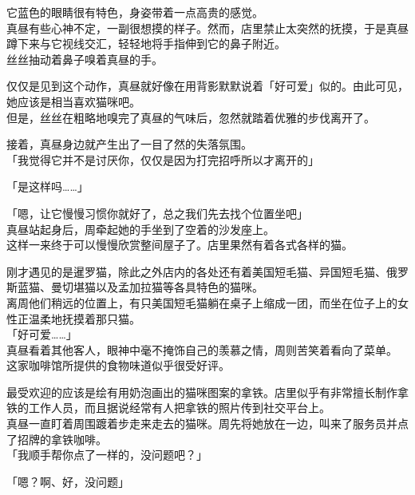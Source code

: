 它蓝色的眼睛很有特色，身姿带着一点高贵的感觉。\\

真昼有些心神不定，一副很想摸的样子。然而，店里禁止太突然的抚摸，于是真昼蹲下来与它视线交汇，轻轻地将手指伸到它的鼻子附近。\\

丝丝抽动着鼻子嗅着真昼的手。

仅仅是见到这个动作，真昼就好像在用背影默默说着「好可爱」似的。由此可见，她应该是相当喜欢猫咪吧。\\

但是，丝丝在粗略地嗅完了真昼的气味后，忽然就踏着优雅的步伐离开了。

接着，真昼身边就产生出了一目了然的失落氛围。\\

「我觉得它并不是讨厌你，仅仅是因为打完招呼所以才离开的」

「是这样吗……」

「嗯，让它慢慢习惯你就好了，总之我们先去找个位置坐吧」\\

真昼站起身后，周牵起她的手坐到了空着的沙发座上。\\

这样一来终于可以慢慢欣赏整间屋子了。店里果然有着各式各样的猫。

刚才遇见的是暹罗猫，除此之外店内的各处还有着美国短毛猫、异国短毛猫、俄罗斯蓝猫、曼切堪猫以及孟加拉猫等各具特色的猫咪。\\

离周他们稍远的位置上，有只美国短毛猫躺在桌子上缩成一团，而坐在位子上的女性正温柔地抚摸着那只猫。\\

「好可爱……」\\

真昼看着其他客人，眼神中毫不掩饰自己的羡慕之情，周则苦笑着看向了菜单。\\

这家咖啡馆所提供的食物味道似乎很受好评。

最受欢迎的应该是绘有用奶泡画出的猫咪图案的拿铁。店里似乎有非常擅长制作拿铁的工作人员，而且据说经常有人把拿铁的照片传到社交平台上。\\

真昼一直盯着周围踱着步走来走去的猫咪。周先将她放在一边，叫来了服务员并点了招牌的拿铁咖啡。\\

「我顺手帮你点了一样的，没问题吧？」

「嗯？啊、好，没问题」\\

